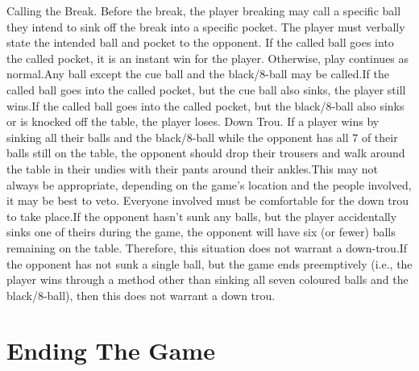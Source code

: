 Calling the Break. Before the break, the player breaking may call a specific ball they intend to sink off the break into a specific pocket. The player must verbally state the intended ball and pocket to the opponent. If the called ball goes into the called pocket, it is an instant win for the player. Otherwise, play continues as normal.\standardspace Any ball except the cue ball and the black/8-ball may be called.\standardspace If the called ball goes into the called pocket, but the cue ball also sinks, the player still wins.\standardspace If the called ball goes into the called pocket, but the black/8-ball also sinks or is knocked off the table, the player loses.%
 Down Trou. If a player wins by sinking all their balls and the black/8-ball while the opponent has all 7 of their balls still on the table, the opponent should drop their trousers and walk around the table in their undies with their pants around their ankles.\standardspace This may not always be appropriate, depending on the game's location and the people involved, it may be best to veto. Everyone involved must be comfortable for the down trou to take place.\standardspace If the opponent hasn’t sunk any balls, but the player accidentally sinks one of theirs during the game, the opponent will have six (or fewer) balls remaining on the table. Therefore, this situation does not warrant a down-trou.\standardspace If the opponent has not sunk a single ball, but the game ends preemptively (i.e., the player wins through a method other than sinking all seven coloured balls and the black/8-ball), then this does not warrant a down trou.%

\section{Ending The Game} \label{8ball:ending}

